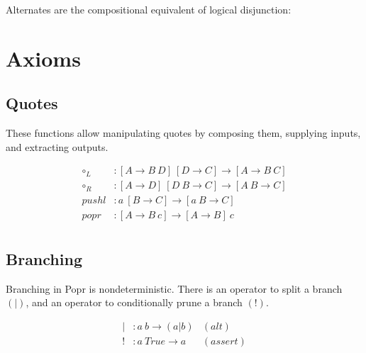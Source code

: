 \documentclass{article}
\begin{document}
Alternates are the compositional equivalent of logical disjunction:

\begin{prooftree}
\end{prooftree}

\begin{prooftree}
\end{prooftree}

\begin{prooftree}
\end{prooftree}

\section{Axioms}

\subsection{Quotes}

These functions allow manipulating quotes by composing them, supplying inputs, and extracting outputs.

\begin{align*}
\circ_L &: [A \to B\ D]\ [D \to C] \to [A \to B\ C] \\
\circ_R &: [A \to D]\ [D\ B \to C] \to [A\ B \to C] \\
pushl &: a\ [B \to C] \to [a\ B \to C] \\
popr &: [A \to B\ c] \to [A \to B]\ c \\
\end{align*}

\subsection{Branching}

Branching in Popr is nondeterministic. There is an operator to split a branch $(\big|)$, and an operator to conditionally prune a branch $(!)$.

\begin{align*}
\big| &: a\ b \to (a \big| b) & (alt) \\
! &: a\ True \to a & (assert) \\
\end{align*}
\end{document}

